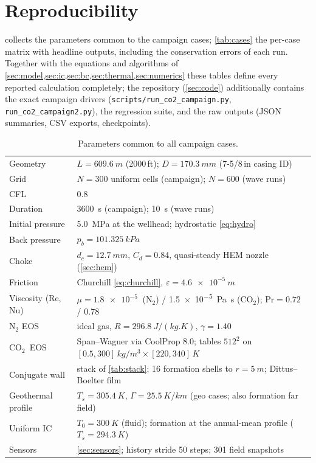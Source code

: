\documentclass[11pt]{article}
\newcommand{\co}{CO$_2$}
\begin{document}
\clearpage   %

\section{Reproducibility}
\label{sec:repro}

 collects the parameters common to the campaign
cases; \cref{tab:cases} the per-case matrix with headline outputs,
including the conservation errors of each run. Together with the
equations and algorithms of
\cref{sec:model,sec:ic,sec:bc,sec:thermal,sec:numerics} these tables
define every reported calculation completely; the repository
(\cref{sec:code}) additionally contains the exact campaign drivers
(\texttt{scripts/run\_co2\_campaign.py},
\texttt{run\_co2\_campaign2.py}), the regression suite, and the raw
outputs (JSON summaries, CSV exports, checkpoints).

\begin{table}[htb]
\centering
\caption{Parameters common to all campaign cases.}
\label{tab:common}
\small
\begin{tabular}{ll}
\toprule
Geometry & $L = \SI{609.6}{m}$ (2000\,ft); $D = \SI{170.3}{mm}$
(7-5/8\,in casing ID)\\
Grid & $N = 300$ uniform cells (campaign); $N = 600$ (wave runs)\\
CFL & 0.8\\
Duration & \SI{3600}{s} (campaign); \SI{10}{s} (wave runs)\\
Initial pressure & \SI{5.0}{MPa} at the wellhead; hydrostatic
\cref{eq:hydro}\\
Back pressure & $p_b = \SI{101.325}{kPa}$\\
Choke & $d_c = \SI{12.7}{mm}$, $C_d = 0.84$, quasi-steady
HEM nozzle (\cref{sec:hem})\\
Friction & Churchill \cref{eq:churchill},
$\varepsilon = \SI{4.6e-5}{m}$\\
Viscosity (Re, Nu) & $\mu = \SI{1.8e-5}{}$ (N$_2$) /
\SI{1.5e-5}{Pa.s} (\co); $\mathrm{Pr} = 0.72$ / 0.78\\
N$_2$ EOS & ideal gas, $R = \SI{296.8}{J/(kg.K)}$, $\gamma = 1.40$\\
\co\ EOS & Span--Wagner via CoolProp 8.0; tables
$512^2$ on $[0.5, 300]\,\si{kg/m^3} \times [220, 340]\,\si{K}$\\
Conjugate wall & stack of \cref{tab:stack}; 16 formation shells to
$r = \SI{5}{m}$; Dittus--Boelter film\\
Geothermal profile & $T_s = \SI{305.4}{K}$,
$\Gamma = \SI{25.5}{K/km}$ (geo cases; also formation far field)\\
Uniform IC & $T_0 = \SI{300}{K}$ (fluid); formation at the
annual-mean profile ($T_s = \SI{294.3}{K}$)\\
Sensors & \cref{sec:sensors}; history stride 50 steps; 301 field
snapshots\\
\bottomrule
\end{tabular}
\end{table}
\end{document}
